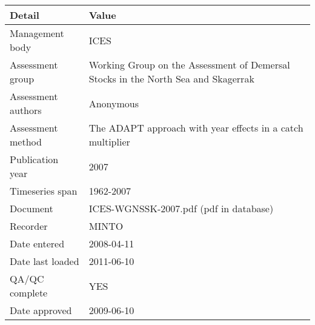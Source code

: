 \begin{table}[htb]
\centering
\begin{tabular}{lp{7cm}}
\toprule
Detail & Value \\
\midrule
Management body    & ICES                                                                              \\
Assessment group   & Working Group on the Assessment of Demersal Stocks in the North Sea and Skagerrak \\
Assessment authors & Anonymous                                                                         \\
Assessment method  & The ADAPT approach with year effects in a catch multiplier                        \\
Publication year   & 2007                                                                              \\
Timeseries span    & 1962-2007                                                                         \\
Document           & ICES-WGNSSK-2007.pdf (pdf in database)                                            \\
Recorder           & MINTO                                                                             \\
Date entered       & 2008-04-11                                                                        \\
Date last loaded   & 2011-06-10                                                                        \\
QA/QC complete     & YES                                                                               \\
Date approved      & 2009-06-10                                                                        \\
\bottomrule
\end{tabular}
\label{tab:assessdet}
\end{table}
